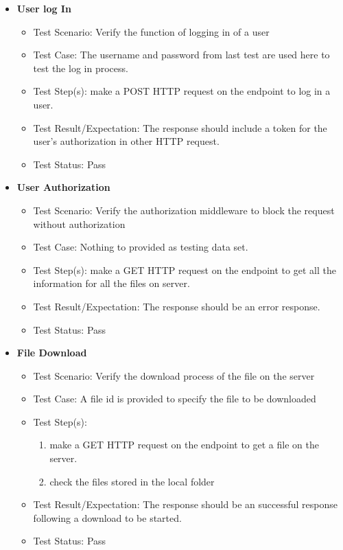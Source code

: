 \documentclass{article}
\begin{document}
\begin{itemize}
\item\textbf{User log In}
\begin{itemize}
        \item{Test Scenario: Verify the function of logging in of a user}
        \item{Test Case: The username and password from last test are used here to test the log in process.}
        \item{Test Step(s): make a POST HTTP request on the endpoint to log in a user.}
        \item{Test Result/Expectation: The response should include a token for the user's authorization in other HTTP request.}
        \item{Test Status: Pass}
\end{itemize}
\item\textbf{User Authorization}
\begin{itemize}
        \item{Test Scenario: Verify the authorization middleware to block the request without authorization}
        \item{Test Case: Nothing to provided as testing data set.}
        \item{Test Step(s): make a GET HTTP request on the endpoint to get all the information for all the files on server.}
        \item{Test Result/Expectation: The response should be an error response.}
        \item{Test Status: Pass}
\end{itemize}
\item\textbf{File Download}
\begin{itemize}
        \item{Test Scenario: Verify the download process of the file on the server}
        \item{Test Case: A file id is provided to specify the file to be downloaded}
        \item{Test Step(s):}
        \begin{enumerate}
                \item{make a GET HTTP request on the endpoint to get a file on the server.}
                \item{check the files stored in the local folder}
            \end{enumerate}
        \item{Test Result/Expectation: The response should be an successful response following a download to be started.}
        \item{Test Status: Pass}

\end{itemize}
\end{itemize}
\end{document}
